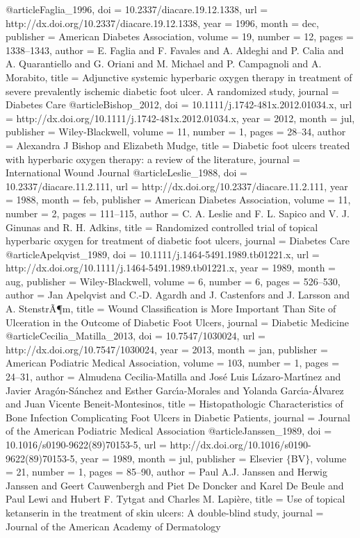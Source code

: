 @article{Faglia_1996,
	doi = {10.2337/diacare.19.12.1338},
	url = {http://dx.doi.org/10.2337/diacare.19.12.1338},
	year = 1996,
	month = {dec},
	publisher = {American Diabetes Association},
	volume = {19},
	number = {12},
	pages = {1338--1343},
	author = {E. Faglia and F. Favales and A. Aldeghi and P. Calia and A. Quarantiello and G. Oriani and M. Michael and P. Campagnoli and A. Morabito},
	title = {Adjunctive systemic hyperbaric oxygen therapy in treatment of severe prevalently ischemic diabetic foot ulcer. A randomized study},
	journal = {Diabetes Care}
}
@article{Bishop_2012,
	doi = {10.1111/j.1742-481x.2012.01034.x},
	url = {http://dx.doi.org/10.1111/j.1742-481x.2012.01034.x},
	year = 2012,
	month = {jul},
	publisher = {Wiley-Blackwell},
	volume = {11},
	number = {1},
	pages = {28--34},
	author = {Alexandra J Bishop and Elizabeth Mudge},
	title = {Diabetic foot ulcers treated with hyperbaric oxygen therapy: a review of the literature},
	journal = {International Wound Journal}
}
@article{Leslie_1988,
	doi = {10.2337/diacare.11.2.111},
	url = {http://dx.doi.org/10.2337/diacare.11.2.111},
	year = 1988,
	month = {feb},
	publisher = {American Diabetes Association},
	volume = {11},
	number = {2},
	pages = {111--115},
	author = {C. A. Leslie and F. L. Sapico and V. J. Ginunas and R. H. Adkins},
	title = {Randomized controlled trial of topical hyperbaric oxygen for treatment of diabetic foot ulcers},
	journal = {Diabetes Care}
}
@article{Apelqvist_1989,
	doi = {10.1111/j.1464-5491.1989.tb01221.x},
	url = {http://dx.doi.org/10.1111/j.1464-5491.1989.tb01221.x},
	year = 1989,
	month = {aug},
	publisher = {Wiley-Blackwell},
	volume = {6},
	number = {6},
	pages = {526--530},
	author = {Jan Apelqvist and C.-D. Agardh and J. Castenfors and J. Larsson and A. StenstrÃ¶m},
	title = {Wound Classification is More Important Than Site of Ulceration in the Outcome of Diabetic Foot Ulcers},
	journal = {Diabetic Medicine}
}
@article{Cecilia_Matilla_2013,
	doi = {10.7547/1030024},
	url = {http://dx.doi.org/10.7547/1030024},
	year = 2013,
	month = {jan},
	publisher = {American Podiatric Medical Association},
	volume = {103},
	number = {1},
	pages = {24--31},
	author = {Almudena Cecilia-Matilla and Jos{\'{e}} Luis L{\'{a}}zaro-Mart{\'{\i}}nez and Javier Arag{\'{o}}n-S{\'{a}}nchez and Esther Garc{\'{\i}}a-Morales and Yolanda Garc{\'{\i}}a-{\'{A}}lvarez and Juan Vicente Beneit-Montesinos},
	title = {Histopathologic Characteristics of Bone Infection Complicating Foot Ulcers in Diabetic Patients},
	journal = {Journal of the American Podiatric Medical Association}
}
@article{Janssen_1989,
	doi = {10.1016/s0190-9622(89)70153-5},
	url = {http://dx.doi.org/10.1016/s0190-9622(89)70153-5},
	year = 1989,
	month = {jul},
	publisher = {Elsevier $\lbrace$BV$\rbrace$},
	volume = {21},
	number = {1},
	pages = {85--90},
	author = {Paul A.J. Janssen and Herwig Janssen and Geert Cauwenbergh and Piet De Doncker and Karel De Beule and Paul Lewi and Hubert F. Tytgat and Charles M. Lapi{\`{e}}re},
	title = {Use of topical ketanserin in the treatment of skin ulcers: A double-blind study},
	journal = {Journal of the American Academy of Dermatology}
}
